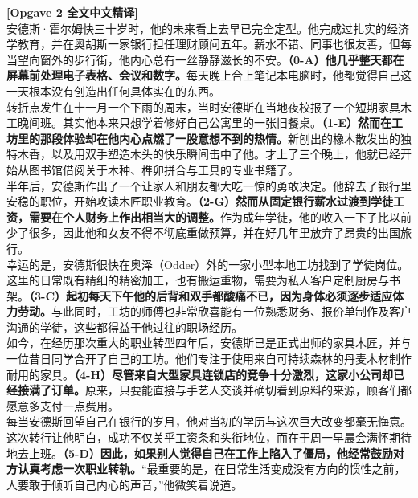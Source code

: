 \begin{transbox}
\small
\textbf{\color{NCDTeal}[Opgave 2 全文中文精译]}\\
安德斯·霍尔姆快三十岁时，他的未来看上去早已完全定型。他完成过扎实的经济学教育，并在奥胡斯一家银行担任理财顾问五年。薪水不错、同事也很友善，但每当望向窗外的步行街，他内心总有一丝静静滋长的不安。\textbf{（0-A）他几乎整天都在屏幕前处理电子表格、会议和数字。}每天晚上合上笔记本电脑时，他都觉得自己这一天根本没有创造出任何具体实在的东西。\\[3pt]
转折点发生在十一月一个下雨的周末，当时安德斯在当地夜校报了一个短期家具木工晚间班。其实他本来只想学着修好自己公寓里的一张旧餐桌。\textbf{（1-E）然而在工坊里的那段体验却在他内心点燃了一股意想不到的热情。}新刨出的橡木散发出的独特木香，以及用双手塑造木头的快乐瞬间击中了他。才上了三个晚上，他就已经开始从图书馆借阅关于木种、榫卯拼合与工具的专业书籍了。\\[3pt]
半年后，安德斯作出了一个让家人和朋友都大吃一惊的勇敢决定。他辞去了银行里安稳的职位，开始攻读木匠职业教育。\textbf{（2-G）然而从固定银行薪水过渡到学徒工资，需要在个人财务上作出相当大的调整。}作为成年学徒，他的收入一下子比以前少了很多，因此他和女友不得不彻底重做预算，并在好几年里放弃了昂贵的出国旅行。\\[3pt]
幸运的是，安德斯很快在奥泽（Odder）外的一家小型本地工坊找到了学徒岗位。这里的日常既有精细的精密加工，也有搬运重物，需要为私人客户定制厨房与书架。\textbf{（3-C）起初每天下午他的后背和双手都酸痛不已，因为身体必须逐步适应体力劳动。}与此同时，工坊的师傅也非常欣喜能有一位熟悉财务、报价单制作及客户沟通的学徒，这些都得益于他过往的职场经历。\\[3pt]
如今，在经历那次重大的职业转型四年后，安德斯已是正式出师的家具木匠，并与一位昔日同学合开了自己的工坊。他们专注于使用来自可持续森林的丹麦木材制作耐用的家具。\textbf{（4-H）尽管来自大型家具连锁店的竞争十分激烈，这家小公司却已经接满了订单。}原来，只要能直接与手艺人交谈并确切看到原料的来源，顾客们都愿意多支付一点费用。\\[3pt]
每当安德斯回望自己在银行的岁月，他对当初的学历与这次巨大改变都毫无悔意。这次转行让他明白，成功不仅关乎工资条和头衔地位，而在于周一早晨会满怀期待地去上班。\textbf{（5-D）因此，如果别人觉得自己在工作上陷入了僵局，他经常鼓励对方认真考虑一次职业转轨。}“最重要的是，在日常生活变成没有方向的惯性之前，人要敢于倾听自己内心的声音，”他微笑着说道。
\end{transbox}

